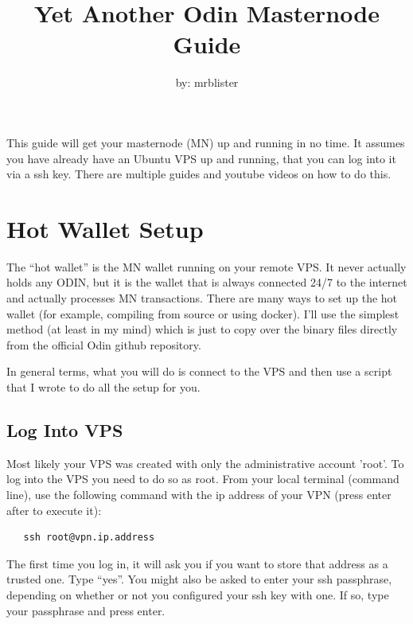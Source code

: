 \documentclass[rmp,12pt,notitlepage]{revtex4-1}
\begin{document}
\title{Yet Another Odin Masternode Guide}
\author{by: mrblister}
\maketitle

This guide will get your masternode (MN) up and running in no time.  It assumes you have already have an Ubuntu VPS up and  running, that you can log into it via a ssh key.  There are multiple guides and youtube videos on how to do this.  

\section{Hot Wallet Setup}
The ``hot wallet'' is the MN wallet running on your remote VPS.  It never actually holds any ODIN, but it is the wallet that is always connected 24/7 to the internet and actually processes MN transactions. There are many ways to set up the hot wallet (for example, compiling from source or using docker).  I'll use the simplest method (at least in my mind) which is just to copy over the binary files directly from the official Odin github repository.  

In general terms, what you will do is connect to the VPS and then use a script that I wrote to do all the setup for you.

\subsection{Log Into VPS} \label{login}
Most likely your VPS was created with only the administrative account 'root'.  To log into the VPS you need to do so as root.  From your local terminal (command line), use the following command with the ip address of your VPN (press enter after to execute it):
\begin{verbatim}
   ssh root@vpn.ip.address 
\end{verbatim}
The first time you log in, it will ask you if you want to store that address as a trusted one.  Type ``yes''.  You might also be asked to enter your ssh passphrase, depending on whether or not you configured your ssh key with one.  If so, type your passphrase and press enter. 
\end{document}
